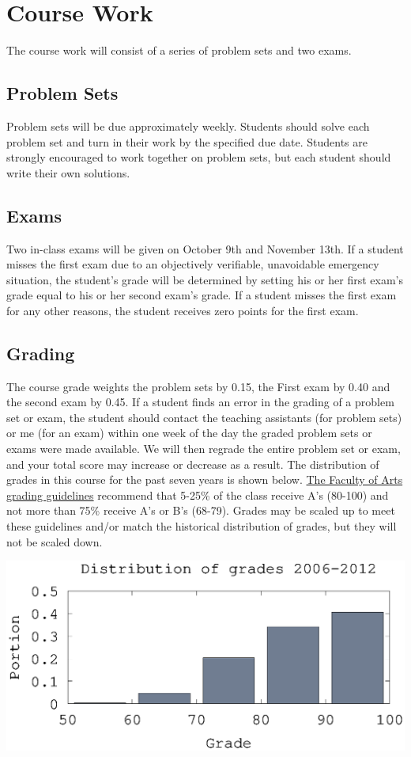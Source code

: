 \documentclass[10pt]{article}
\begin{document}
\section{Course Work}

The course work will consist of a series of problem sets and two
exams. 

\subsection{Problem Sets}
Problem sets will be due approximately weekly.  Students should solve
each problem set and turn in their work by the specified due
date. Students are strongly encouraged to work together on problem
sets, but each student should write their own solutions.

\subsection{Exams}
Two in-class exams will be given on October 9th and November 13th. If
a student misses the first exam due to an objectively verifiable,
unavoidable emergency situation, the student's grade will be
determined by setting his or her first exam's grade equal to his or her
second exam's grade. If a student misses the first exam for any other
reasons, the student receives zero points for the first exam.

\subsection{Grading}
The course grade weights the problem sets by 0.15, the First exam by
0.40 and the second exam by 0.45. If a student finds an error in the
grading of a problem set or exam, the student should contact the
teaching assistants (for problem sets) or me (for an exam) within one
week of the day the graded problem sets or exams were made
available. We will then regrade the entire problem set or exam, and
your total score may increase or decrease as a result.  The
distribution of grades in this course for the past seven years is shown
below.
\href{http://www.arts.ubc.ca/faculty-amp-staff/resources/courses-and-grading/grading-guidelines.html}
{The Faculty of Arts grading guidelines} recommend that 5-25\% of the
class receive A's (80-100) and not more than 75\% receive A's or B's
(68-79). Grades may be scaled up to meet these guidelines and/or match
the historical distribution of grades, but they will not be scaled
down. 

\begin{centering}
  \includegraphics[width=0.8\linewidth]{526gradeDist}
\end{centering}
\end{document}
